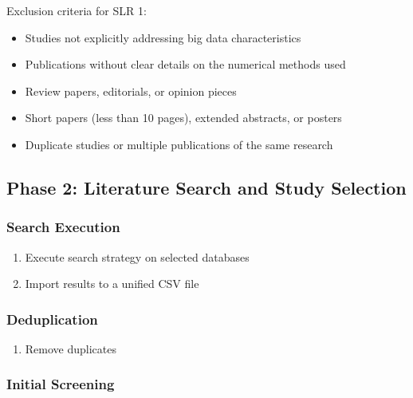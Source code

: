 \documentclass[acmsmall]{acmart}
\begin{document}
Exclusion criteria for SLR 1:
\begin{itemize}
    \item Studies not explicitly addressing big data characteristics
    \item Publications without clear details on the numerical methods used
    \item Review papers, editorials, or opinion pieces
    \item Short papers (less than 10 pages), extended abstracts, or posters
    \item Duplicate studies or multiple publications of the same research
\end{itemize}

\subsection{Phase 2: Literature Search and Study Selection}\label{subsec:phase-2-literature-search-and-study-selection}
\subsubsection{Search Execution}\label{subsubsec:phase-2-literature-search-and-study-selection:search-execution}
\begin{enumerate}
    \item Execute search strategy on selected databases
    \item Import results to a unified CSV file
\end{enumerate}

\subsubsection{Deduplication}\label{subsubsec:phase-2-literature-search-and-study-selection:deduplication}

\begin{enumerate}
    \item Remove duplicates
\end{enumerate}

\subsubsection{Initial Screening}\label{subsubsec:phase-2-literature-search-and-study-selection:initial-screening}
\end{document}
